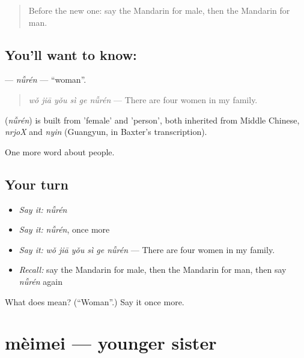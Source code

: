 \begin{quote}
Before the new one: say the Mandarin for male, then the Mandarin for man.
\end{quote}

\subsection*{You'll want to know: }
\textbf{} — \emph{nǚrén} — \textquotedblleft{}woman\textquotedblright{}.

\begin{quote}
\textbf{} \emph{wǒ jiā yǒu sì ge nǚrén} — There are four women in my family.
\end{quote}

\begin{cousinweb}
\textbf{} (\emph{nǚrén}) is built from  'female' and  'person', both inherited from Middle Chinese, \emph{nrjoX} and \emph{nyin} (Guangyun, in Baxter's transcription).
\end{cousinweb}

\begin{grammarlens}[title={What you've built}]
One more word about people.
\end{grammarlens}

\subsection*{Your turn}
\begin{itemize}
\raggedright
  \item \emph{Say it:} \emph{nǚrén}
  \item \emph{Say it:} \emph{nǚrén}, once more
  \item \emph{Say it:} \emph{wǒ jiā yǒu sì ge nǚrén} — There are four women in my family.
  \item \emph{Recall:} say the Mandarin for male, then the Mandarin for man, then say \emph{nǚrén} again
\end{itemize}

\begin{tcolorbox}[breakable,colback=teal!4,colframe=teal!35!black,title={Before you move on}]
What does  mean? (\textquotedblleft{}Woman\textquotedblright{}.) Say it once more.
\end{tcolorbox}
\section[mèimei]{mèimei — younger sister}

